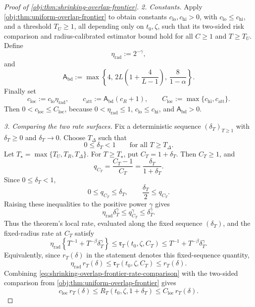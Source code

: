 \begin{proof}[Proof of \cref{obj:thm:shrinking-overlap-frontier}]
\emph{2. Constants.}
Apply \cref{obj:thm:uniform-overlap-frontier} to obtain constants
\(c_{\mathrm{lo}},c_{\mathrm{hi}}>0\), with
\(c_{\mathrm{lo}}\le c_{\mathrm{hi}}\), and a threshold \(T_U\ge1\), all
depending only on \(t_0,\zeta\), such that its two-sided risk comparison and
radius-calibrated estimator bound hold for all \(C\ge1\) and \(T\ge T_U\).
Define
\[
\eta_{\mathrm{rad}}:=2^{-\gamma},
\]
and
\[
\mathsf A_{\mathrm{bd}}
:=
\max\left\{
4,\,
2L\left(1+\frac{4}{L-1}\right),\,
\frac{8}{1-\alpha}
\right\}.
\]
Finally set
\[
c_{\mathrm{loc}}:=c_{\mathrm{lo}}\eta_{\mathrm{rad}},
\qquad
c_{\mathrm{att}}:=\mathsf A_{\mathrm{bd}}(c_R+1),
\qquad
C_{\mathrm{loc}}:=\max\{c_{\mathrm{hi}},c_{\mathrm{att}}\}.
\]
Then \(0<c_{\mathrm{loc}}\le C_{\mathrm{loc}}\), because
\(0<\eta_{\mathrm{rad}}\le1\), \(c_{\mathrm{lo}}\le c_{\mathrm{hi}}\), and
\(\mathsf A_{\mathrm{bd}}>0\). %

\emph{3. Comparing the two rate surfaces.}
Fix a deterministic sequence \((\delta_T)_{T\ge1}\) with
\(\delta_T\ge0\) and \(\delta_T\to0\).  Choose \(T_\Delta\) such that
\[
0\le\delta_T<1\qquad\text{for all }T\ge T_\Delta .
\]
Let \(T_\star=\max\{T_U,T_R,T_\Delta\}\).  For \(T\ge T_\star\), put
\(C_T=1+\delta_T\).  Then \(C_T\ge1\), and
\[
q_{C_T}
=
\frac{C_T-1}{C_T}
=
\frac{\delta_T}{1+\delta_T}.
\]
Since \(0\le\delta_T<1\),
\[
0\le q_{C_T}\le\delta_T,
\qquad
\frac{\delta_T}{2}\le q_{C_T}.
\]
Raising these inequalities to the positive power \(\gamma\) gives
\[
\eta_{\mathrm{rad}}\delta_T^\gamma
\le
q_{C_T}^\gamma
\le
\delta_T^\gamma .
\]
Thus the theorem's local rate, evaluated along the fixed sequence \((\delta_T)\), and the fixed-radius rate at \(C_T\) satisfy
\begin{equation}\label{eq:shrinking-overlap-frontier-rate-comparison}
\eta_{\mathrm{rad}}\left\{T^{-1}+T^{-\beta}\delta_T^\gamma\right\}
\le
\mathfrak r_T(t_0,\zeta,C_T)
\le
T^{-1}+T^{-\beta}\delta_T^\gamma.
\end{equation}
Equivalently, since \(r_T(\delta)\) in the statement denotes this fixed-sequence quantity,
\[
\eta_{\mathrm{rad}}\,r_T(\delta)
\le
\mathfrak r_T(t_0,\zeta,C_T)
\le
r_T(\delta).
\]
Combining \cref{eq:shrinking-overlap-frontier-rate-comparison} with the two-sided comparison from
\cref{obj:thm:uniform-overlap-frontier} gives
\begin{equation}\label{eq:shrinking-overlap-frontier-risk-comparison}
c_{\mathrm{loc}}\,r_T(\delta)
\le
R_T(t_0,\zeta,1+\delta_T)
\le
C_{\mathrm{loc}}\,r_T(\delta).
\end{equation}


\end{proof}
